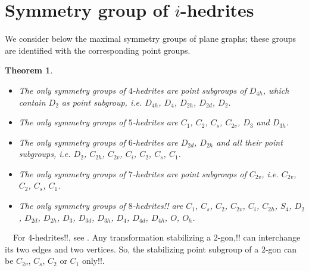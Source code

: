 \documentclass[12pt]{article}
\newtheorem{theor}{Theorem}
\newcommand{\proof}{\noindent{\bf Proof.}\ \ }
\begin{document}
\section{Symmetry group of $i$-hedrites}
We consider below the maximal symmetry groups of plane graphs; these groups are identified with the corresponding point groups.



%
%
%




\begin{theor}
\begin{itemize}
\item[(i)] The only symmetry groups of $4$-hedrites are point subgroups of $D_{4h}$, which contain $D_{2}$ as point subgroup, i.e. $D_{4h}$, $D_4$, $D_{2h}$, $D_{2d}$, $D_2$.

\item[(ii)] The only symmetry groups of $5$-hedrites are $C_1$, $C_2$, $C_s$, $C_{2v}$, $D_3$ and $D_{3h}$.

\item[(iii)] The only symmetry groups of $6$-hedrites are $D_{2d}$, $D_{2h}$ and all their point subgroups, i.e. $D_{2}$, $C_{2h}$, $C_{2v}$, $C_i$, $C_{2}$, $C_{s}$, $C_{1}$.

\item[(iv)] The only symmetry groups of $7$-hedrites are point subgroups of $C_{2v}$, i.e. $C_{2v}$, $C_{2}$, $C_{s}$, $C_{1}$.

\item[(v)] The only symmetry groups of $8$-hedrites!! are $C_{1}$, $C_s$, $C_2$, $C_{2v}$, $C_i$, $C_{2h}$, $S_4$, $D_2$, $D_{2d}$, $D_{2h}$, $D_3$, $D_{3d}$, $D_{3h}$, $D_4$, $D_{4d}$, $D_{4h}$, $O$, $O_h$.

\end{itemize}


\end{theor}
\proof For $4$-hedrites!!, see \cite{DSt}. Any transformation 
stabilizing a $2$-gon,!! can interchange its two edges and two vertices. So, the stabilizing point subgroup of a $2$-gon can be $C_{2v}$, $C_s$, 
$C_2$ or $C_1$ only!!.
\end{document}

